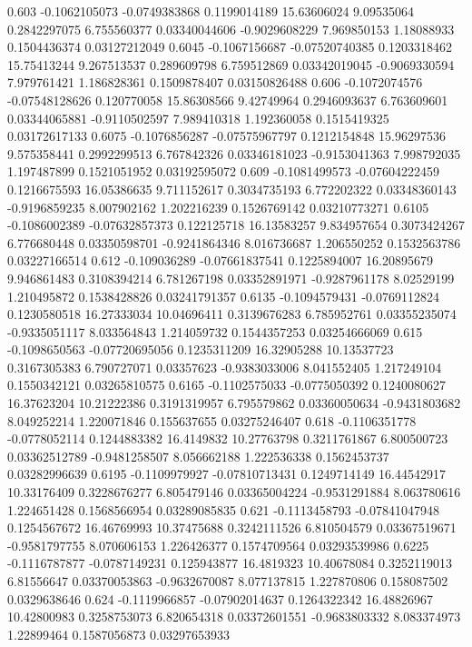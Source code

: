 {0.603 -0.1062105073 -0.0749383868 0.1199014189 15.63606024 9.09535064 0.2842297075 6.755560377 0.03340044606 -0.9029608229 7.969850153 1.18088933 0.1504436374 0.03127212049
0.6045 -0.1067156687 -0.07520740385 0.1203318462 15.75413244 9.267513537 0.289609798 6.759512869 0.03342019045 -0.9069330594 7.979761421 1.186828361 0.1509878407 0.03150826488
0.606 -0.1072074576 -0.07548128626 0.120770058 15.86308566 9.42749964 0.2946093637 6.763609601 0.03344065881 -0.9110502597 7.989410318 1.192360058 0.1515419325 0.03172617133
0.6075 -0.1076856287 -0.07575967797 0.1212154848 15.96297536 9.575358441 0.2992299513 6.767842326 0.03346181023 -0.9153041363 7.998792035 1.197487899 0.1521051952 0.03192595072
0.609 -0.1081499573 -0.07604222459 0.1216675593 16.05386635 9.711152617 0.3034735193 6.772202322 0.03348360143 -0.9196859235 8.007902162 1.202216239 0.1526769142 0.03210773271
0.6105 -0.1086002389 -0.07632857373 0.122125718 16.13583257 9.834957654 0.3073424267 6.776680448 0.03350598701 -0.9241864346 8.016736687 1.206550252 0.1532563786 0.03227166514
0.612 -0.109036289 -0.07661837541 0.1225894007 16.20895679 9.946861483 0.3108394214 6.781267198 0.03352891971 -0.9287961178 8.02529199 1.210495872 0.1538428826 0.03241791357
0.6135 -0.1094579431 -0.0769112824 0.1230580518 16.27333034 10.04696411 0.3139676283 6.785952761 0.03355235074 -0.9335051117 8.033564843 1.214059732 0.1544357253 0.03254666069
0.615 -0.1098650563 -0.07720695056 0.1235311209 16.32905288 10.13537723 0.3167305383 6.790727071 0.03357623 -0.9383033006 8.041552405 1.217249104 0.1550342121 0.03265810575
0.6165 -0.1102575033 -0.0775050392 0.1240080627 16.37623204 10.21222386 0.3191319957 6.795579862 0.03360050634 -0.9431803682 8.049252214 1.220071846 0.155637655 0.03275246407
0.618 -0.1106351778 -0.0778052114 0.1244883382 16.4149832 10.27763798 0.3211761867 6.800500723 0.03362512789 -0.9481258507 8.056662188 1.222536338 0.1562453737 0.03282996639
0.6195 -0.1109979927 -0.07810713431 0.1249714149 16.44542917 10.33176409 0.3228676277 6.805479146 0.03365004224 -0.9531291884 8.063780616 1.224651428 0.1568566954 0.03289085835
0.621 -0.1113458793 -0.07841047948 0.1254567672 16.46769993 10.37475688 0.3242111526 6.810504579 0.03367519671 -0.9581797755 8.070606153 1.226426377 0.1574709564 0.03293539986
0.6225 -0.1116787877 -0.0787149231 0.125943877 16.4819323 10.40678084 0.3252119013 6.81556647 0.03370053863 -0.9632670087 8.077137815 1.227870806 0.158087502 0.0329638646
0.624 -0.1119966857 -0.07902014637 0.1264322342 16.48826967 10.42800983 0.3258753073 6.820654318 0.03372601551 -0.9683803332 8.083374973 1.22899464 0.1587056873 0.03297653933
}
